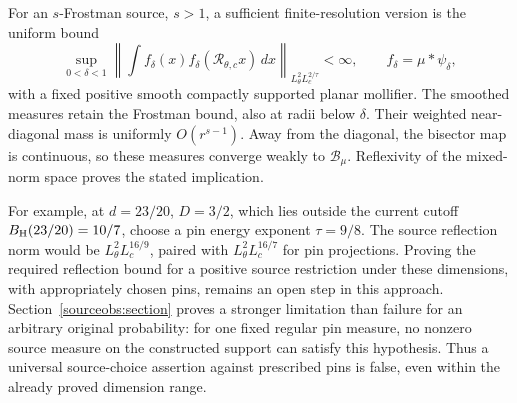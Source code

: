 For an \(s\)-Frostman source, \(s>1\), a sufficient finite-resolution
version is the uniform bound
\[
 \sup_{0<\delta<1}
 \left\|\int f_\delta(x)f_\delta(\mathcal R_{\theta,c}x)\,dx
       \right\|_{L^2_\theta L^{2/\tau}_c}<\infty,
 \qquad f_\delta=\mu*\psi_\delta,
\]
with a fixed positive smooth compactly supported planar mollifier.
The smoothed measures retain the Frostman bound, also at radii below
\(\delta\). Their weighted near-diagonal mass is uniformly
\(O(r^{s-1})\). Away from the diagonal, the bisector map is continuous,
so these measures converge weakly to \(\mathcal B_\mu\).
Reflexivity of the mixed-norm space proves the stated implication.

For example, at \(d=23/20\), \(D=3/2\), which lies outside the
current cutoff \(B_{\rm H}(23/20)=10/7\), choose a pin energy exponent
\(\tau=9/8\). The source reflection norm would be
\(L^2_\theta L^{16/9}_c\), paired with
\(L^2_\theta L^{16/7}_c\) for pin projections. Proving the required
reflection bound for a positive source restriction under these
dimensions, with appropriately chosen pins, remains an open step in this
approach. Section~\ref{sourceobs:section} proves a stronger limitation
than failure for an arbitrary original probability: for one fixed regular
pin measure, no nonzero source measure on the constructed support can
satisfy this hypothesis. Thus a universal source-choice assertion against
prescribed pins is false, even within the already proved dimension range.
